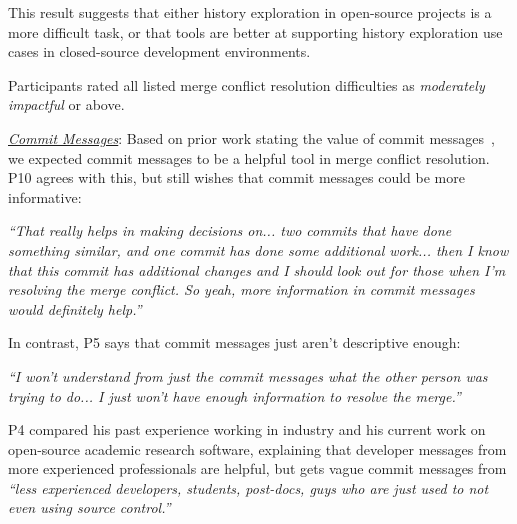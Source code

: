 This result suggests that either history exploration in open-source projects is a more difficult task, or that tools are better at supporting history exploration use cases in closed-source development environments.

\begin{tcolorbox}[enhanced,minipage boxed title,enhanced,title={Takeaway \arabic{takeawaycounter}},
attach boxed title to top left=
{xshift=0mm,yshift=-1mm},
boxed title style={size=small}]
Participants rated all listed merge conflict resolution difficulties as \textit{moderately impactful} or above.
\end{tcolorbox}
\addtocounter{takeawaycounter}{1}

\underline{\textit{Commit Messages}}:
Based on prior work stating the value of commit messages~\cite{yamauchi2014clustering}\cite{hindle2009automatic}\cite{cortes2014automatically}\cite{hattori2008nature}, we expected commit messages to be a helpful tool in merge conflict resolution. 
P10 agrees with this, but still wishes that commit messages could be more informative:
\begin{displayquote}
	\textit{``That really helps in making decisions on... two commits that have done something similar, and one commit has done some additional work... then I know that this commit has additional changes and I should look out for those when I'm resolving the merge conflict. So yeah, more information in commit messages would definitely help.''}
\end{displayquote}

In contrast, P5 says that commit messages just aren't descriptive enough:
\begin{displayquote}
\textit{``I won't understand from just the commit messages what the other person was trying to do... I just won't have enough information to resolve the merge.''}
\end{displayquote}

P4 compared his past experience working in industry and his current work on open-source academic research software, explaining that developer messages from more experienced professionals are helpful, but gets vague commit messages from \textit{``less experienced developers, students, post-docs, guys who are just used to not even using source control.''}

